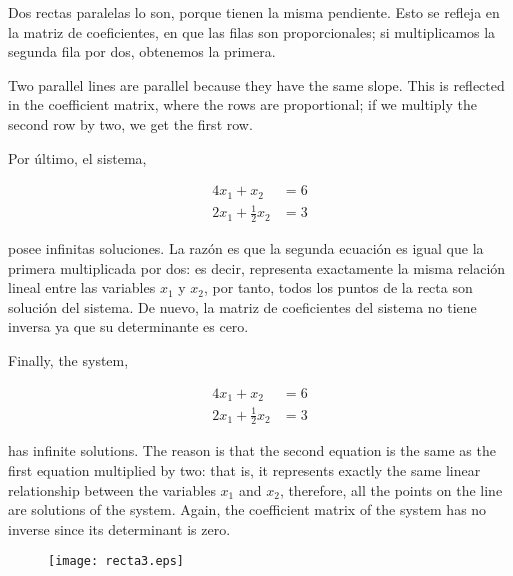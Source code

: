 \begin{paracol}{2}
Dos rectas paralelas lo son, porque tienen la misma pendiente. Esto se refleja en la matriz de coeficientes, en que las filas son proporcionales; si multiplicamos la segunda fila por dos, obtenemos la primera. 

\switchcolumn

Two parallel lines are parallel because they have the same slope. This is reflected in the coefficient matrix, where the rows are proportional; if we multiply the second row by two, we get the first row. 

\switchcolumn
Por último, el sistema,

\begin{align*}
4x_1+x_2&=6\\
2x_1+\frac{1}{2} x_2&=3
\end{align*}

posee infinitas soluciones. La razón es que la segunda ecuación es igual que la primera multiplicada por dos: es decir, representa exactamente la misma relación lineal entre las variables $x_1$ y $x_2$, por tanto, todos los puntos de la recta son solución del sistema. De nuevo, la matriz de coeficientes del sistema no tiene inversa ya que su determinante es cero.

\switchcolumn
Finally, the system,

\begin{align*}
4x_1+x_2&=6 \\
2x_1+\frac{1}{2} x_2&=3
\end{align*}

has infinite solutions. The reason is that the second equation is the same as the first equation multiplied by two: that is, it represents exactly the same linear relationship between the variables $x_1$ and $x_2$, therefore, all the points on the line are solutions of the system. Again, the coefficient matrix of the system has no inverse since its determinant is zero.
\end{paracol}

\begin{figure}[h]
\centering
\texttt{[image: recta3.eps]}
\label{recta3}
\end{figure}

